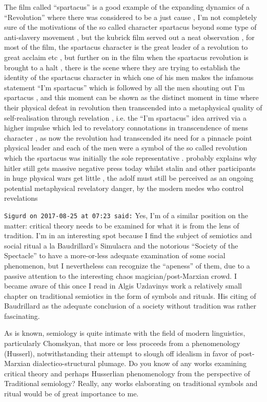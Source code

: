 \begin{footnotesize}
\begin{sffamily}
The film called ``spartacus'' is a good example of the expanding dynamics of a ``Revolution'' where there was considered to be a just cause , I'm not completely sure of the motivations of the so called character spartacus beyond some type of anti-slavery movement , but the kubrick film served out a neat observation , for most of the film, the spartacus character is the great leader of a revolution to great acclaim etc , but further on in the film when the spartacus revolution is brought to a halt , there is the scene where they are trying to establish the identity of the spartacus character in which one of his men makes the infamous statement ``I'm spartacus'' which is followed by all the men shouting out I'm spartacus , and this moment can be shown as the distinct moment in time where their physical defeat in revolution then transcended into a metaphysical quality of self-realisation through revelation , i.e. the ``I'm spartacus'' idea arrived via a higher impulse which led to revelatory connotations in transcendence of mens character , as now the revolution had transcended its need for a pinnacle point physical leader and each of the men were a symbol of the so called revolution which the spartacus was initially the sole representative . probably explains why hitler still gets massive negative press today whilst stalin and other participants in huge physical wars get little , the adolf must still be perceived as an ongoing potential metaphysical revelatory danger, by the modern medes who control revelations

\hfill

\texttt{Sigurd on 2017-08-25 at 07:23 said:}
Yes, I'm of a similar position on the matter: critical theory needs to be examined for what it is from the lens of tradition. I'm in an interesting spot because I find the subject of semiotics and social ritual a la Baudrillard's Simulacra and the notorious ``Society of the Spectacle'' to have a more-or-less adequate examination of some social phenomenon, but I nevertheless can recognize the ``apeness'' of them, due to a passive attention to the interesting chaos magician/post-Marxian crowd. I became aware of this once I read in Algis Uzdavinys work a relatively small chapter on traditional semiotics in the form of symbols and rituals. His citing of Baudrillard as the adequate conclusion of a society without tradition was rather fascinating.

As is known, semiology is quite intimate with the field of modern linguistics, particularly Chomskyan, that more or less proceeds from a phenomenology (Husserl), notwithstanding their attempt to slough off idealism in favor of post-Marxian dialectico-structural plumage. Do you know of any works examining critical theory and perhaps Husserlian phenomenology from the perspective of Traditional semiology? Really, any works elaborating on traditional symbols and ritual would be of great importance to me.


\end{sffamily}
\end{footnotesize}
